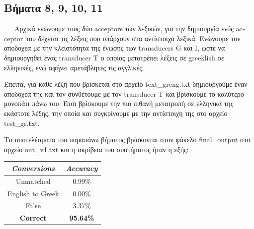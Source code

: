 \documentclass{article}
\begin{document}
\subsection*{Βήματα 8, 9, 10, 11}
\ \ \ Αρχικά ενώνουμε τους δύο \textlatin{acceptors} των λεξικών, για την δημιουργία ενός \textlatin{acceptor} που δέχεται τις λέξεις που υπάρχουν στα αντίστοιχα λεξικά. Ενώνουμε τον αποδοχέα με την κλειστότητα της ένωσης των \textlatin{transducers G} και \textlatin{I}, ώστε να δημιουργηθεί ένας \textlatin{transducer T} ο οποίος μετατρέπει λέξεις σε \textlatin{greeklish} σε ελληνικές, ενώ αφήνει αμετάβλητες τις αγγλικές. \par
Έπειτα, για κάθε λέξη που βρίσκεται στο αρχείο \textlatin{text\_greng.txt} δημιουργούμε έναν αποδοχέα της και τον συνθέτουμε με τον \textlatin{transducer T} και βρίσκουμε το καλύτερο μονοπάτι πάνω του. Έτσι βρίσκουμε την πιο πιθανή μετατροπή σε ελληνικά της εκάστοτε λέξης, την οποία και συγκρίνουμε με την αντίστοιχη της στο αρχείο \textlatin{test\_gr.txt}. \par
Τα αποτελέσματα του παραπάνω βήματος βρίσκονται στον φάκελο \textlatin{final\_output} στο αρχείο \textlatin{out\_v1.txt} και η ακρίβεια του συστήματος ήταν η εξής: \\
\begin{center}
	\begin{tabular}{|| c | c ||}
	\hline
	\textit{\textlatin{Conversions}} & \textit{\textlatin{Accuracy}} \\ [0.5ex]
	\hline\hline
	\textlatin{Unmatched} & 0.99\% \\
	\hline
	\textlatin{English to Greek} & 0.00\% \\
	\hline
	\textlatin{False} & 3.37\% \\
	\hline
	\textbf{\textlatin{Correct}} & \textbf{95.64\%} \\ [1ex]
	\hline
	\end{tabular}
\end{center}
\end{document}
